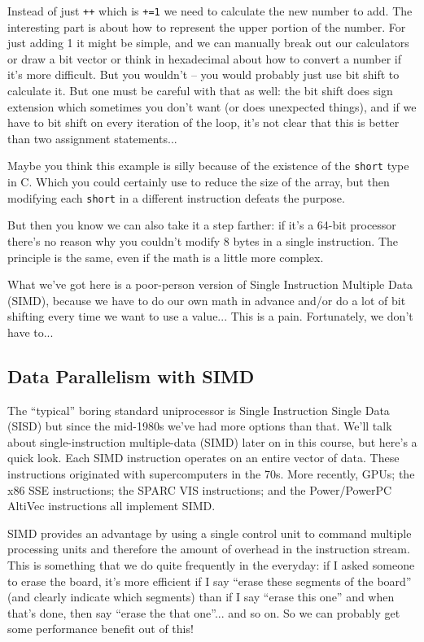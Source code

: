 \documentclass[a4paper]{report}
\begin{document}
Instead of just \texttt{++} which is \texttt{+=1} we need to calculate the new number to add. The interesting part is about how to represent the upper portion of the number. For just adding 1 it might be simple, and we can manually break out our calculators or draw a bit vector or think in hexadecimal about how to convert a number if it's more difficult. But you wouldn't -- you would probably just use bit shift to calculate it. But one must be careful with that as well: the bit shift does sign extension which sometimes you don't want (or does unexpected things), and if we have to bit shift on every iteration of the loop, it's not clear that this is better than two assignment statements...

Maybe you think this example is silly because of the existence of the \texttt{short} type in C. Which you could certainly use to reduce the size of the array, but then modifying each \texttt{short} in a different instruction defeats the purpose.

But then you know we can also take it a step farther: if it's a 64-bit processor there's no reason why you couldn't modify 8 bytes in a single instruction. The principle is the same, even if the math is a little more complex.

What we've got here is a poor-person version of Single Instruction Multiple Data (SIMD), because we have to do our own math in advance and/or do a lot of bit shifting every time we want to use a value... This is a pain. Fortunately, we don't have to...

\subsection*{Data Parallelism with SIMD}
The ``typical'' boring standard uniprocessor is Single Instruction Single Data (SISD) but since the mid-1980s we've had more options than that. We'll talk about single-instruction multiple-data (SIMD) later on in
this course, but here's a quick look. Each SIMD
instruction operates on an entire vector of data. These instructions
originated with supercomputers in the 70s. More recently, GPUs; the
x86 SSE instructions; the SPARC VIS instructions; and the
Power/PowerPC AltiVec instructions all implement SIMD.

SIMD provides an advantage by using a single control unit to command multiple processing units and therefore the amount of overhead in the instruction stream. This is something that we do quite frequently in the everyday: if I asked someone to erase the board, it's more efficient if I say ``erase these segments of the board'' (and clearly indicate which segments) than if I say ``erase this one'' and when that's done, then say ``erase the that one''... and so on. So we can probably get some performance benefit out of this!
\end{document}
